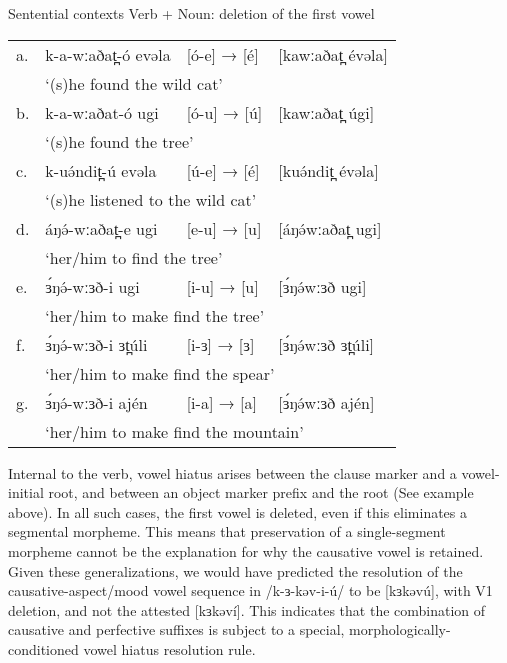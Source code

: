 \ea Sentential contexts Verb + Noun: deletion of the first vowel 
\begin{tabular}[t]{llll}
a.&	k-a-wːaðat̪-ó  evəla	&	[ó-e] → [é]	&	[kawːaðat̪ évəla]\\
& \multicolumn{3}{l}{‘(s)he found the wild cat’}\\
b.&		k-a-wːaðat-ó  ugi&	[ó-u] →	[ú]	&	[kawːaðat̪ úgi]\\
& \multicolumn{3}{l}{‘(s)he found the tree’}\\
c.&		k-uə́ndit̪-ú evəla	&	[ú-e] →	[é]	&	[kuə́ndit̪ évəla] \\
& \multicolumn{3}{l}{‘(s)he listened to the wild cat’}\\
d.&		áŋə́-wːaðat̪-e ugi	&	[e-u] →	[u]	&	[áŋə́wːaðat̪ ugi]\\
& \multicolumn{3}{l}{‘her/him to find the tree’}\\
e.&		ɜ́ŋə́-wːɜð-i ugi	&	[i-u] →	[u]	&	[ɜ́ŋə́wːɜð ugi]	\\
& \multicolumn{3}{l}{‘her/him to make find the tree’}\\
f.&		ɜ́ŋə́-wːɜð-i ɜt̪úli	&	[i-ɜ] →	[ɜ]	&	[ɜ́ŋə́wːɜð ɜt̪úli]\\
& \multicolumn{3}{l}{‘her/him to make find the spear’}\\
g.&	ɜ́ŋə́-wːɜð-i ajén		&	[i-a] →	[a]	&	[ɜ́ŋə́wːɜð ajén] \\
& \multicolumn{3}{l}{‘her/him to make find the mountain’}\\
\end{tabular}
\z 
Internal to the verb, vowel hiatus arises between the clause marker and a vowel-initial root, and between an object marker prefix and the root (See example  above). In all such cases, the first vowel is deleted, even if this eliminates a segmental morpheme. This means that preservation of a single-segment morpheme cannot be the explanation for why the causative vowel is retained.  Given these generalizations, we would have predicted the resolution of the causative-aspect/mood vowel sequence in  /k-ɜ-kəv-i-ú/  to be [kɜkəvú], with V1 deletion, and not the attested [kɜkəví]. This indicates that the combination of causative and perfective suffixes is subject to a special, morphologically-conditioned vowel hiatus resolution rule.
  


